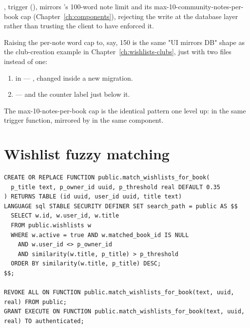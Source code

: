 , trigger  (), mirrors 's 100-word note limit and its max-10-community-notes-per-book cap (Chapter~\ref{ch:components}), rejecting the write at the database layer rather than trusting the client to have enforced it.

\begin{olkhowto}
Raising the per-note word cap to, say, 150 is the same "UI mirrors DB" shape as the club-creation example in Chapter~\ref{ch:wishlists-clubs}, just with two files instead of one:
\begin{enumerate}
  \item {} in  — , changed inside a new migration.
  \item {} —  and the  counter label just below it.
\end{enumerate}
The max-10-notes-per-book cap is the identical pattern one level up:  in the same trigger function, mirrored by  in the same component.
\end{olkhowto}

\section{Wishlist fuzzy matching}

\begin{lstlisting}[style=olkcodesql, caption={match\_wishlists\_for\_book — pg\_trgm similarity search across all users}]
CREATE OR REPLACE FUNCTION public.match_wishlists_for_book(
  p_title text, p_owner_id uuid, p_threshold real DEFAULT 0.35
) RETURNS TABLE (id uuid, user_id uuid, title text)
LANGUAGE sql STABLE SECURITY DEFINER SET search_path = public AS $$
  SELECT w.id, w.user_id, w.title
  FROM public.wishlists w
  WHERE w.active = true AND w.matched_book_id IS NULL
    AND w.user_id <> p_owner_id
    AND similarity(w.title, p_title) > p_threshold
  ORDER BY similarity(w.title, p_title) DESC;
$$;

REVOKE ALL ON FUNCTION public.match_wishlists_for_book(text, uuid, real) FROM public;
GRANT EXECUTE ON FUNCTION public.match_wishlists_for_book(text, uuid, real) TO authenticated;
\end{lstlisting}

